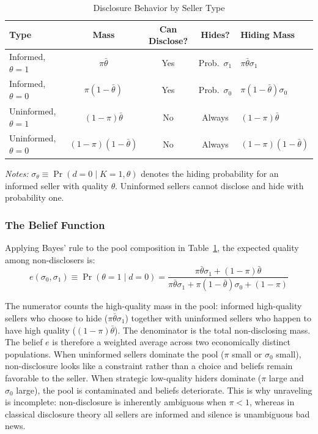 \documentclass[10pt,letterpaper]{bp-template-concise}
\begin{document}
\begin{table}[H]
\centering
\caption{Disclosure Behavior by Seller Type}
\label{tab:who_hides}
\small
\renewcommand{\arraystretch}{1.3}
\setlength{\tabcolsep}{20pt}
\begin{tabular}{lcccl}
\toprule
\toprule
\textbf{Type} & \textbf{Mass} & \textbf{Can Disclose?} & \textbf{Hides?} & \textbf{Hiding Mass} \\
\midrule
Informed, $\theta=1$ & $\pi \bar{\theta}$ & Yes & Prob.\ $\sigma_1$ & $\pi \bar{\theta} \sigma_1$ \\
Informed, $\theta=0$ & $\pi (1-\bar{\theta})$ & Yes & Prob.\ $\sigma_0$ & $\pi (1-\bar{\theta}) \sigma_0$ \\
Uninformed, $\theta=1$ & $(1-\pi) \bar{\theta}$ & No & Always & $(1-\pi) \bar{\theta}$ \\
Uninformed, $\theta=0$ & $(1-\pi) (1-\bar{\theta})$ & No & Always & $(1-\pi) (1-\bar{\theta})$ \\
\bottomrule
\bottomrule
\end{tabular}

\vspace{0.5em}
\raggedright
\footnotesize
\textit{Notes:} $\sigma_\theta \equiv \Pr(d=0 \mid K=1, \theta)$ denotes the hiding probability for an informed seller with quality $\theta$. Uninformed sellers cannot disclose and hide with probability one.
\end{table}

\subsubsection{The Belief Function}

Applying Bayes' rule to the pool composition in Table~\ref{tab:who_hides}, the expected quality among non-disclosers is:
\begin{equation}
    e(\sigma_0, \sigma_1) \equiv \Pr(\theta=1 \mid d=0) = \frac{\pi \bar{\theta} \sigma_1 + (1-\pi) \bar{\theta}}{\pi \bar{\theta} \sigma_1 + \pi (1-\bar{\theta}) \sigma_0 + (1-\pi)}
    \label{eq:belief_general}
\end{equation}

The numerator counts the high-quality mass in the pool: informed high-quality sellers who choose to hide ($\pi\bar{\theta}\sigma_1$) together with uninformed sellers who happen to have high quality ($(1-\pi)\bar{\theta}$). The denominator is the total non-disclosing mass. The belief $e$ is therefore a weighted average across two economically distinct populations. When uninformed sellers dominate the pool ($\pi$ small or $\sigma_0$ small), non-disclosure looks like a constraint rather than a choice and beliefs remain favorable to the seller. When strategic low-quality hiders dominate ($\pi$ large and $\sigma_0$ large), the pool is contaminated and beliefs deteriorate. This is why unraveling is incomplete: non-disclosure is inherently ambiguous when $\pi < 1$, whereas in classical disclosure theory all sellers are informed and silence is unambiguous bad news.
\end{document}
